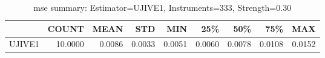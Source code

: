 \begin{table}[ht]
\centering
\caption{mse summary: Estimator=UJIVE1, Instruments=333, Strength=0.30}
\begin{tabular}{lrrrrrrrr}
\toprule
 & COUNT & MEAN & STD & MIN & 25\% & 50\% & 75\% & MAX \\
\midrule
UJIVE1 & 10.0000 & 0.0086 & 0.0033 & 0.0051 & 0.0060 & 0.0078 & 0.0108 & 0.0152 \\
\bottomrule
\end{tabular}
\end{table}
